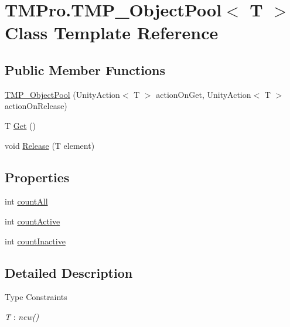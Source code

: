 \hypertarget{class_t_m_pro_1_1_t_m_p___object_pool}{}\section{T\+M\+Pro.\+T\+M\+P\+\_\+\+Object\+Pool$<$ T $>$ Class Template Reference}
\label{class_t_m_pro_1_1_t_m_p___object_pool}
\subsection*{Public Member Functions}
\begin{DoxyCompactItemize}
\item 
\mbox{\hyperlink{class_t_m_pro_1_1_t_m_p___object_pool_abac083490dabbd73d8fd069b7992c18b}{T\+M\+P\+\_\+\+Object\+Pool}} (Unity\+Action$<$ T $>$ action\+On\+Get, Unity\+Action$<$ T $>$ action\+On\+Release)
\item 
T \mbox{\hyperlink{class_t_m_pro_1_1_t_m_p___object_pool_ac06efec7fc4061a729cfb6dfc0e66f82}{Get}} ()
\item 
void \mbox{\hyperlink{class_t_m_pro_1_1_t_m_p___object_pool_a7d1275be300c5e87b0f50dff43ff6b63}{Release}} (T element)
\end{DoxyCompactItemize}
\subsection*{Properties}
\begin{DoxyCompactItemize}
\item 
int \mbox{\hyperlink{class_t_m_pro_1_1_t_m_p___object_pool_a1aa8a0fe53daff4b514c865692d35dd5}{count\+All}}
\item 
int \mbox{\hyperlink{class_t_m_pro_1_1_t_m_p___object_pool_a09a7afea64eb1ddf8942caf6da2853a1}{count\+Active}}
\item 
int \mbox{\hyperlink{class_t_m_pro_1_1_t_m_p___object_pool_a2e5c8c7744a87bfd9723d1b92f65f929}{count\+Inactive}}
\end{DoxyCompactItemize}


\subsection{Detailed Description}
\begin{Desc}
\item[Type Constraints]\begin{description}
\item[{\em T} : {\em new()}]\end{description}
\end{Desc}


